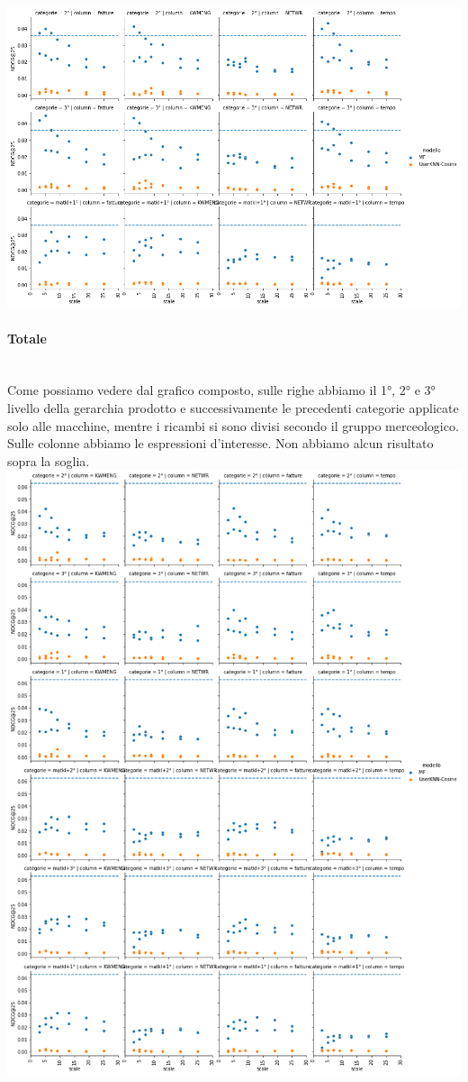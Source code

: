 \includegraphics[width=16cm]{figures/risultati_ordered_categoria_ricambi.png}

\paragraph{Totale}\mbox{} \\
Come possiamo vedere dal grafico composto, sulle righe abbiamo il 1°, 2° e 3° livello della gerarchia prodotto e successivamente le precedenti categorie applicate solo alle macchine, mentre i ricambi si sono divisi secondo il gruppo merceologico. Sulle colonne abbiamo le espressioni d'interesse. Non abbiamo alcun risultato sopra la soglia.\\

\includegraphics[width=16cm]{figures/risultati_ordered_categoria_totale.png}


